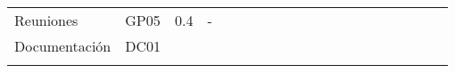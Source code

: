 \begin{longtable}[c]{llclllllllllllllllll}
        \multicolumn{1}{|l|}{Reuniones}                                                       & \multicolumn{1}{l|}{GP05}                                                      & \multicolumn{1}{l|}{0.4}                                                         & \multicolumn{1}{l|}{-}                                                               &                                 &                                 &                                 & \cellcolor[HTML]{EF8787}        &                                 &                                 &                                 &                                 &                                 &                                 &                                 &                                 &                                 & \cellcolor[HTML]{EF8787}        & \multicolumn{1}{l|}{}                         &  \\ \cline{1-4}
        \multicolumn{1}{|l|}{Documentación}                                                   & \multicolumn{1}{l|}{DC01}                                                      & \multicolumn{1}{l|}{}                                                            & \multicolumn{1}{l|}{}                                                                &                                 &                                 &                                 &                                 &                                 &                                 &                                 &                                 &                                 &                                 &                                 &                                 &                                 &                                 & \multicolumn{1}{l|}{}                         &  \\ \cline{1-19}
        \multicolumn{4}{|l|}{}                                                                                                                                                                                                                                                                                                                           & \multicolumn{15}{l|}{}                                                                                                                                                                                                                                                                                                                                                                                                                                                                                                                    &  \\ \cline{1-19}

\end{longtable}
